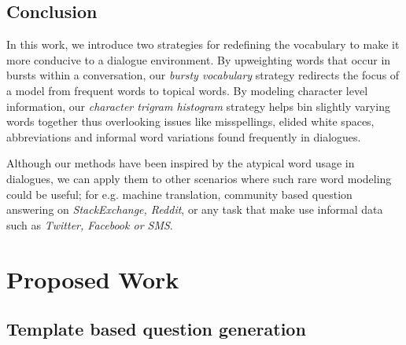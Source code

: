 \documentclass[11pt]{report}
\begin{document}
\section{Conclusion}

In this work, we introduce two strategies for redefining the vocabulary to make it more conducive to a dialogue environment. By upweighting words that occur in bursts within a conversation, our \textit{bursty vocabulary} strategy redirects the focus of a model from frequent words to topical words. By modeling character level information, our \textit{character trigram histogram} strategy helps bin slightly varying words together thus overlooking issues like misspellings, elided white spaces, abbreviations and informal word variations found frequently in dialogues. 

Although our methods have been inspired by the atypical word usage in dialogues, we can apply them to other scenarios where such rare word modeling could be useful; for e.g. machine translation, community based question answering on \textit{StackExchange, Reddit}, or any task that make use informal data such as \textit{Twitter, Facebook or SMS}.

\newpage

\chapter{Proposed Work}\label{proposed_work}

\section{Template based question generation}
\end{document}
